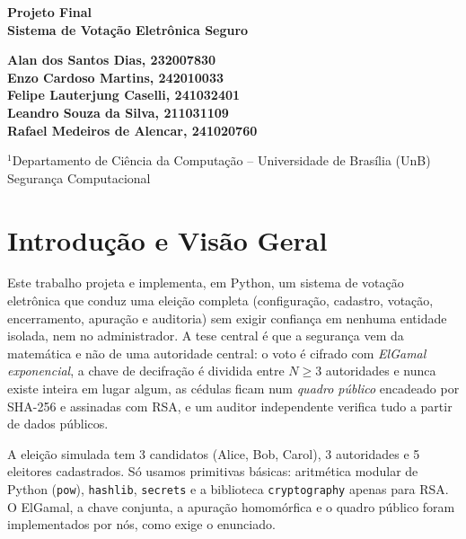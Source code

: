 \documentclass[11pt,a4paper]{article}
\begin{document}
\begin{center}
{\selectfont
{\Large\bfseries Projeto Final\\[2pt] Sistema de Votação Eletrônica Seguro\par}
\vspace{14pt}
{\large\bfseries Alan dos Santos Dias, 232007830\\
Enzo Cardoso Martins, 242010033\\
Felipe Lauterjung Caselli, 241032401\\
Leandro Souza da Silva, 211031109\\
Rafael Medeiros de Alencar, 241020760\\
\par}
\vspace{12pt}
{\large $^{1}$Departamento de Ciência da Computação -- Universidade de Brasília (UnB)\\
Segurança Computacional\par}
}
\end{center}
\vspace{4pt}

\section{Introdução e Visão Geral}
Este trabalho projeta e implementa, em Python, um sistema de votação eletrônica que conduz uma eleição completa (configuração, cadastro, votação, encerramento, apuração e auditoria) sem exigir confiança em nenhuma entidade isolada, nem no administrador. A tese central é que a segurança vem da matemática e não de uma autoridade central: o voto é cifrado com \emph{ElGamal exponencial}, a chave de decifração é dividida entre $N\ge 3$ autoridades e nunca existe inteira em lugar algum, as cédulas ficam num \emph{quadro público} encadeado por SHA-256 e assinadas com RSA, e um auditor independente verifica tudo a partir de dados públicos.

A eleição simulada tem 3 candidatos (Alice, Bob, Carol), 3 autoridades e 5 eleitores cadastrados. Só usamos primitivas básicas: aritmética modular de Python (\texttt{pow}), \texttt{hashlib}, \texttt{secrets} e a biblioteca \texttt{cryptography} apenas para RSA. O ElGamal, a chave conjunta, a apuração homomórfica e o quadro público foram implementados por nós, como exige o enunciado.

\end{document}
